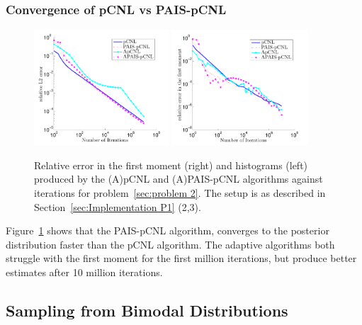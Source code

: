\documentclass[final]{siamltex}
\begin{document}
\subsubsection{Convergence of pCNL vs PAIS-pCNL}

\begin{figure}[htb]
\centering
\includegraphics[width=0.45\textwidth]{"figures/pCNL2l"}
\includegraphics[width=0.45\textwidth]{"figures/pCNL2m"}
\caption{Relative error in the first moment (right) and histograms (left) produced by the (A)pCNL and (A)PAIS-pCNL algorithms against iterations for problem~\ref{sec:problem 2}. The setup is as described in Section~\ref{sec:Implementation P1} (2,3).}
\label{fig:MH2 L2}
\end{figure}

Figure~\ref{fig:MH2 L2} shows that the PAIS-pCNL algorithm, converges to the posterior distribution faster than the pCNL algorithm. The adaptive algorithms both struggle with the first moment for the first million iterations, but produce better estimates after 10 million iterations. 

\subsection{Sampling from Bimodal Distributions}
\end{document}
